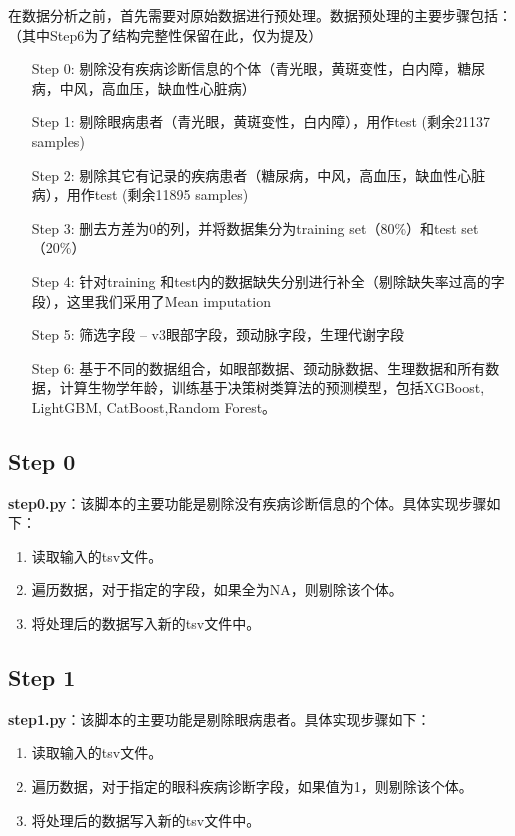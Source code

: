 \documentclass[UTF8]{report}
\theoremstyle{MyLineTheoremStyle} %
\theoremstyle{MyBlockTheoremStyle} %
\theoremstyle{MySubsubsectionStyle} %
\begin{document}
在数据分析之前，首先需要对原始数据进行预处理。数据预处理的主要步骤包括：（其中Step6为了结构完整性保留在此，仅为提及）

\begin{itemize}
    \item[Step 0:] 剔除没有疾病诊断信息的个体（青光眼，黄斑变性，白内障，糖尿病，中风，高血压，缺血性心脏病）
    \item[Step 1:] 剔除眼病患者（青光眼，黄斑变性，白内障），用作test (剩余21137 samples)
    \item[Step 2:] 剔除其它有记录的疾病患者（糖尿病，中风，高血压，缺血性心脏病），用作test (剩余11895 samples)
    \item[Step 3:] 删去方差为0的列，并将数据集分为training set（80\%）和test set（20\%）
    \item[Step 4:] 针对training 和test内的数据缺失分别进行补全（剔除缺失率过高的字段），这里我们采用了Mean imputation
    \item[Step 5:] 筛选字段 – v3眼部字段，颈动脉字段，生理代谢字段
    \item[Step 6:] 基于不同的数据组合，如眼部数据、颈动脉数据、生理数据和所有数据，计算生物学年龄，训练基于决策树类算法的预测模型，包括XGBoost, LightGBM, CatBoost,Random Forest。
\end{itemize}

\subsection*{Step 0}

\textbf{step0.py}：该脚本的主要功能是剔除没有疾病诊断信息的个体。具体实现步骤如下：
\begin{enumerate}
    \item 读取输入的tsv文件。
    \item 遍历数据，对于指定的字段，如果全为NA，则剔除该个体。
    \item 将处理后的数据写入新的tsv文件中。
\end{enumerate}

\subsection*{Step 1}

\textbf{step1.py}：该脚本的主要功能是剔除眼病患者。具体实现步骤如下：
\begin{enumerate}
    \item 读取输入的tsv文件。
    \item 遍历数据，对于指定的眼科疾病诊断字段，如果值为1，则剔除该个体。
    \item 将处理后的数据写入新的tsv文件中。
\end{enumerate}
\end{document}
